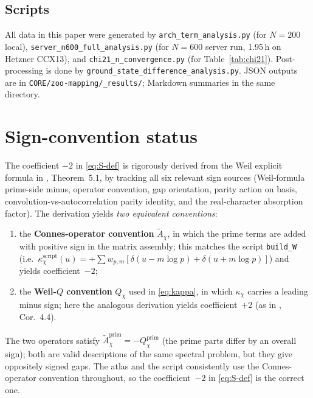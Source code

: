 \documentclass[10pt,twocolumn]{article}
\theoremstyle{definition}
\theoremstyle{remark}
\newcommand{\chifn}{\chi}
\begin{document}
\subsection{Scripts}
All data in this paper were generated by
\texttt{arch\_term\_analysis.py} (for $N=200$ local),
\texttt{server\_n600\_full\_analysis.py} (for $N=600$ server run,
1.95\,h on Hetzner CCX13), and
\texttt{chi21\_n\_convergence.py} (for Table~\ref{tab:chi21}).
Post-processing is done by \texttt{ground\_state\_difference\_analysis.py}.
JSON outputs are in \texttt{CORE/zoo-mapping/\_results/}; Markdown
summaries in the same directory.

\section{Sign-convention status}
\label{app:sign}

The coefficient $-2$ in \eqref{eq:S-def} is rigorously derived from
the Weil explicit formula in \cite{AnalyticKernelV2},
Theorem~5.1, by tracking all six relevant sign sources (Weil-formula
prime-side minus, operator convention, gap orientation, parity
action on basis, convolution-vs-autocorrelation parity identity,
and the real-character absorption factor). The derivation yields
\emph{two equivalent conventions}:
\begin{enumerate}
  \item the \textbf{Connes-operator convention} $\tilde A_{\chifn}$,
    in which the prime terms are added with positive sign in the
    matrix assembly; this matches the script
    \texttt{build\_W} (i.e.\ $\kappa^{\mathrm{script}}_{\chifn}(u)
    =+\sum w_{p,m}[\delta(u-m\log p)+\delta(u+m\log p)]$) and
    yields coefficient~$-2$;
  \item the \textbf{Weil-$Q$ convention} $Q_{\chifn}$ used in
    \eqref{eq:kappa}, in which $\kappa_{\chifn}$ carries a leading
    minus sign; here the analogous derivation yields
    coefficient~$+2$ (as in \cite{AnalyticKernel}, Cor.~4.4).
\end{enumerate}
The two operators satisfy
$\tilde A_{\chifn}^{\mathrm{prim}}=-Q_{\chifn}^{\mathrm{prim}}$ (the
prime parts differ by an overall sign); both are valid descriptions
of the same spectral problem, but they give oppositely signed gaps.
The atlas and the script consistently use the Connes-operator
convention throughout, so the coefficient~$-2$ in
\eqref{eq:S-def} is the correct one.
\end{document}
